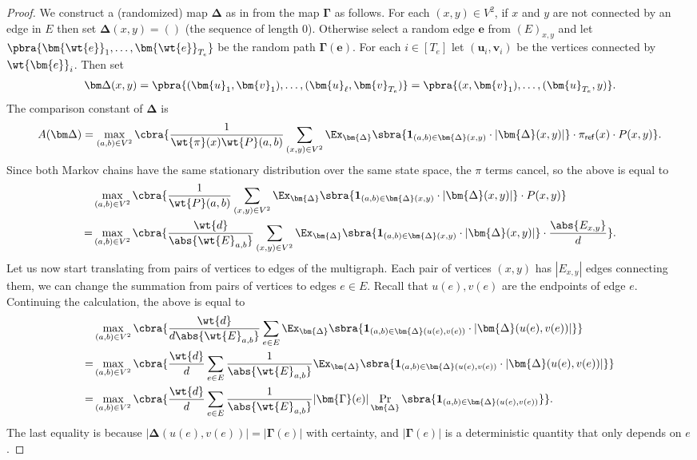 \begin{proof}
    We construct a (randomized) map $\bm\Delta$ as in  from the map $\bm\Gamma$ as follows. For each $(x,y)\in V^2$, if $x$ and $y$ are not connected by an edge in $E$ then set $\bm\Delta(x,y)=()$ (the sequence of length 0). Otherwise select a random edge $\bm{e}$ from $(E)_{x,y}$ and let $\pbra{\bm{\wt{e}}_1,\dots,\bm{\wt{e}}_{{T_e}}}$ be the random path $\bm\Gamma(\bm{e})$. For each $i\in [T_e]$ let $(\bm{u}_i,\bm{v}_i)$ be the vertices connected by $\wt{\bm{e}}_i$. Then set 
    \begin{align*}
        \bm\Delta(x,y)=\pbra{(\bm{u}_1,\bm{v}_1),\dots, (\bm{u}_{\ell},\bm{v}_{T_e})}=\pbra{(x,\bm{v}_1),\dots, (\bm{u}_{T_e},y)}.
    \end{align*}
    The comparison constant of $\bm{\Delta}$ is
    $$A(\bm\Delta)=\max_{(a,b)\in V^2} \cbra{\frac{1}{\wt{\pi}(x)\wt{P}(a,b)}\sum_{(x,y)\in V^2}\Ex_{\bm{\Delta}}\sbra{\mathbf{1}_{(a, b) \in \bm{\Delta}(x,y)}\cdot |\bm{\Delta}(x,y)|}\cdot  \pi_{\mathsf{ref}}(x)\cdot P(x, y)}.$$
    Since both Markov chains have the same stationary distribution over the same state space, the $\pi$ terms cancel, so the above is equal to
    \begin{align*}
        &\max_{(a,b)\in V^2} \cbra{\frac{1}{\wt{P}(a,b)}\sum_{(x,y)\in V^2}\Ex_{\bm{\Delta}}\sbra{\mathbf{1}_{(a, b) \in \bm{\Delta}(x,y)}\cdot |\bm{\Delta}(x,y)|}\cdot  P(x, y)}\\
        =&\max_{(a,b)\in V^2} \cbra{\frac{\wt{d}}{\abs{\wt{E}_{a,b}}}\sum_{(x,y)\in V^2}\Ex_{\bm{\Delta}}\sbra{\mathbf{1}_{(a, b) \in \bm{\Delta}(x,y)}\cdot |\bm{\Delta}(x,y)|}\cdot  \frac{\abs{E_{x,y}}}{d}}.
    \end{align*}
    Let us now start translating from pairs of vertices to edges of the multigraph. Each pair of vertices $(x, y)$ has $\left|E_{x,y}\right|$ edges connecting them, we can change the summation from pairs of vertices to edges $e \in E$. Recall that $u(e), v(e)$ are the endpoints of edge $e$. Continuing the calculation, the above is equal to 
    \begin{align*}
        &\max_{(a,b)\in V^2} \cbra{\frac{\wt{d}}{d\abs{\wt{E}_{a,b}}}\sum_{e\in E}\Ex_{\bm{\Delta}}\sbra{\mathbf{1}_{(a, b) \in \bm{\Delta}(u(e),v(e))}\cdot |\bm{\Delta}(u(e),v(e))|} }\\
        =&\max_{(a,b)\in V^2} \cbra{\frac{\wt{d}}{d}\sum_{e\in E} \frac{1}{\abs{\wt{E}_{a,b}}}\Ex_{\bm{\Delta}}\sbra{\mathbf{1}_{(a, b) \in \bm{\Delta}(u(e),v(e))}\cdot |\bm{\Delta}(u(e),v(e))|}}\\
        =&\max_{(a,b)\in V^2} \cbra{\frac{\wt{d}}{d}\sum_{e\in E} \frac{1}{\abs{\wt{E}_{a,b}}}|\bm{\Gamma}(e)|\Pr_{\bm{\Delta}}\sbra{\mathbf{1}_{(a, b) \in \bm{\Delta}(u(e),v(e))}}}.
    \end{align*}
    The last equality is because $|\bm\Delta(u(e),v(e))|=|\bm\Gamma(e)|$ with certainty, and $|\bm\Gamma(e)|$ is a deterministic quantity that only depends on $e$.


\end{proof}
